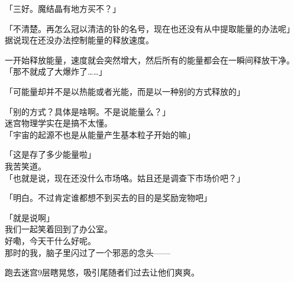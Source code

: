 「三好。魔结晶有地方买不？」

「不清楚。再怎么冠以清洁的钋的名号，现在也还没有从中提取能量的办法呢」\\

据说现在还没办法控制能量的释放速度。

一开始释放能量，速度就会突然增大，然后所有的能量都会在一瞬间释放干净。\\

「那不就成了大爆炸了……」

「可能量却并不是以热能或者光能，而是以一种别的方式释放的」

「别的方式？具体是啥啊。不是说能量么？」\\

迷宫物理学实在是搞不太懂。\\

「宇宙的起源不也是从能量产生基本粒子开始的嘛」

「这是存了多少能量啦」\\

我苦笑道。\\

「也就是说，现在还没什么市场咯。姑且还是调查下市场价吧？」

「明白。不过肯定谁都想不到买去的目的是奖励宠物吧」

「就是说啊」\\

我们一起笑着回到了办公室。\\

好嘞，今天干什么好呢。\\

那时的我，脑子里闪过了一个邪恶的念头——

跑去迷宫9层瞎晃悠，吸引尾随者们过去让他们爽爽。\\
